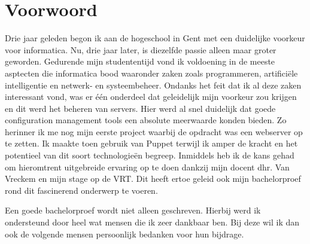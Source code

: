 
\chapter*{Voorwoord}
\label{ch:voorwoord}


Drie jaar geleden begon ik aan de hogeschool in Gent met een duidelijke voorkeur voor informatica. Nu, drie jaar later, is diezelfde passie alleen maar groter geworden. Gedurende mijn studententijd vond ik voldoening in de meeste asptecten die informatica bood waaronder zaken zoals programmeren, artifici\"ele intelligentie en netwerk- en systeembeheer. Ondanks het feit dat ik al deze zaken interessant vond, was er \'e\'en onderdeel dat geleidelijk mijn voorkeur zou krijgen en dit werd het beheren van servers.
 \newline
Hier werd al snel duidelijk dat goede configuration management tools een absolute meerwaarde konden bieden. Zo herinner ik me nog mijn eerste project waarbij de opdracht was een webserver op te zetten. Ik maakte toen gebruik van Puppet terwijl ik amper de kracht en het potentieel van dit soort technologie\"en begreep. Inmiddels heb ik de kans gehad om hieromtrent uitgebreide ervaring op te doen dankzij mijn docent dhr. Van Vreckem en mijn stage op de VRT. Dit heeft ertoe geleid ook mijn bachelorproef rond dit fascinerend onderwerp te voeren.

Een goede bachelorproef wordt niet alleen geschreven. Hierbij werd ik ondersteund door heel wat mensen die ik zeer dankbaar ben. Bij deze wil ik dan ook de volgende mensen persoonlijk bedanken voor hun bijdrage.

